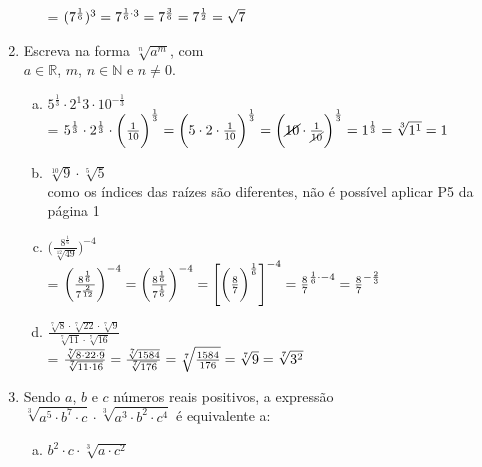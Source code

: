 \documentclass[a4paper,14pt]{article}
\begin{document}
\begin{multicols}{2}
\begin{enumerate}
\begin{enumerate}[a)]
        	= $(7^\frac{1}{6})^3
        	= 7^{\frac{1}{6} \cdot 3}
        	= 7^\frac{3}{6}
        	= 7^\frac{1}{2} \\
        	= \sqrt{7}$
        \end{enumerate}
        \item Escreva na forma $\sqrt[n]{a^m}$, com \\$a \in \mathbb{R}$, $m$, $n \in \mathbb{N}$ e $n \neq 0$.
        \begin{enumerate}[a)]
        	\item $5^\frac{1}{3} \cdot 2^{1}{3} \cdot 10^{-\frac{1}{3}}$\\
        	= $5^\frac{1}{3} \cdot 2^\frac{1}{3} \cdot \bigg(\frac{1}{10}\bigg)^\frac{1}{3} \\
        	= \bigg( 5 \cdot 2 \cdot \frac{1}{10}\bigg)^\frac{1}{3}
        	= \bigg(\cancel{10} \cdot \frac{1}{\cancel{10}}\bigg)^\frac{1}{3} \\
        	= 1^\frac{1}{3}
        	= \sqrt[3]{1^1}
        	= 1$
        	\item $\sqrt[10]{9} \cdot \sqrt[5]{5}$\\
        	como os índices das raízes são diferentes, não é possível aplicar P5 da página 1
        	\item $\bigg( \frac{8^\frac{1}{6}}{\sqrt[12]{49}} \bigg)^{-4}$\\
        	= $\bigg(\frac{8^\frac{1}{6}}{7^\frac{2}{12}}\bigg)^{-4}
        	= \bigg(\frac{8^\frac{1}{6}}{7^\frac{1}{6}}\bigg)^{-4} \\
        	= \left[\bigg(\frac{8}{7}\bigg)^\frac{1}{6}\right]^{-4}
        	= \frac{8}{7}^{\frac{1}{6} \cdot -4} \\
        	= \frac{8}{7}^{-\frac{2}{3}}$
        	\item $\frac{\sqrt[7]{8} \cdot \sqrt[7]{22} \cdot \sqrt[7]{9}}{\sqrt[7]{11} \cdot \sqrt[7]{16}}$\\
        	= $\frac{\sqrt[7]{8 \cdot 22 \cdot 9}}{\sqrt[7]{11 \cdot 16}}
        	= \frac{\sqrt[7]{1584}}{\sqrt[7]{176}} \\
        	= \sqrt[7]{\frac{1584}{176}}
        	= \sqrt[7]{9} = \sqrt[7]{3^2}$
        \end{enumerate}
        \item Sendo $a$, $b$ e $c$ números reais positivos, a expressão\\ $\sqrt[3]{a^5 \cdot b^7 \cdot c} \cdot \sqrt[3]{a^3 \cdot b^2 \cdot c^4}$ é equivalente a:
        \begin{enumerate}[a)]
            \item $b^2 \cdot c \cdot \sqrt[3]{a \cdot c^2}$

\end{enumerate}
\end{enumerate}
\end{multicols}
\end{document}
